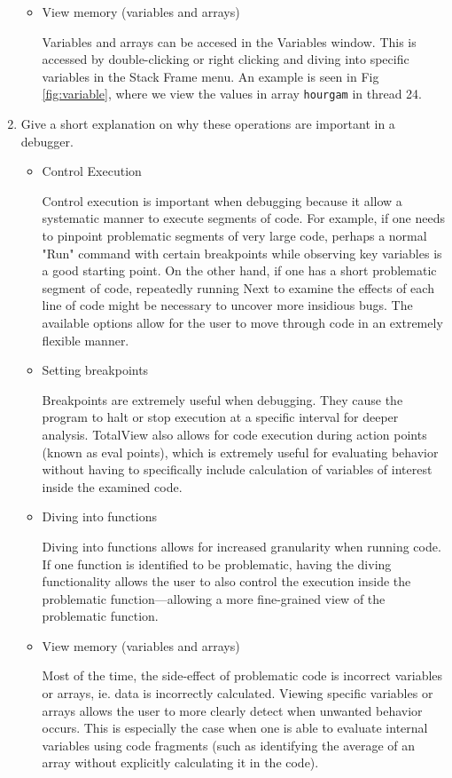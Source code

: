 \documentclass{article}
\begin{document}
\begin{enumerate}
\begin{itemize}
	\item View memory (variables and arrays)
	
	Variables and arrays can be accesed in the Variables window. This is accessed by double-clicking or right clicking and diving into specific variables in the Stack Frame menu. An example is seen in Fig \ref{fig:variable}, where we view the values in array \verb!hourgam! in thread 24.

	\end{itemize}
\item Give a short explanation on why these operations are important in a debugger.
	\begin{itemize}
	\item Control Execution
	
	Control execution is important when debugging because it allow a systematic manner to execute segments of code. For example, if one needs to pinpoint problematic segments of very large code, perhaps a normal "Run" command with certain breakpoints while observing key variables is a good starting point. On the other hand, if one has a short problematic segment of code, repeatedly running Next to examine the effects of each line of code might be necessary to uncover more insidious bugs. The available options allow for the user to move through code in an extremely flexible manner.
	\item Setting breakpoints
		
	Breakpoints are extremely useful when debugging. They cause the program to halt or stop execution at a specific interval for deeper analysis. TotalView also allows for code execution during action points (known as eval points), which is extremely useful for evaluating behavior without having to specifically include calculation of variables of interest inside the examined code. 
	\item Diving into functions
	
	Diving into functions allows for increased granularity when running code. If one function is identified to be problematic, having the diving functionality allows the user to also control the execution inside the problematic function---allowing a more fine-grained view of the problematic function.	
	\item View memory (variables and arrays)
	
	Most of the time, the side-effect of problematic code is incorrect variables or arrays, ie. data is incorrectly calculated. Viewing specific variables or arrays allows the user to more clearly detect when unwanted behavior occurs. This is especially the case when one is able to evaluate internal variables using code fragments (such as identifying the average of an array without explicitly calculating it in the code).

	\end{itemize}

\end{enumerate}
\end{document}
